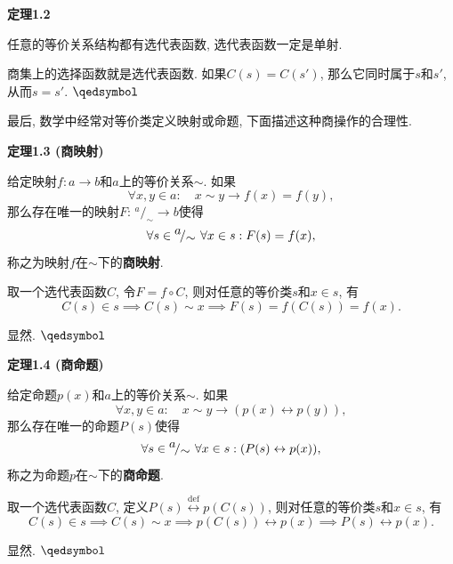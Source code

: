 \hypertarget{sec:定理1.2}{}
\noindent\textbf{定理1.2}

任意的等价关系结构都有选代表函数, 选代表函数一定是单射.


商集上的选择函数就是选代表函数.
如果$C(s)=C(s')$, 那么它同时属于$s$和$s'$, 从而$s=s'$. \hfill $\qedsymbol$

\vspace{10pt}

最后, 数学中经常对等价类定义映射或命题, 下面描述这种商操作的合理性.

\vspace{10pt}

\hypertarget{sec:定理1.3}{}
\noindent\textbf{定理1.3 (商映射)}

给定映射$f:a\to b$和$a$上的等价关系$\sim$. 如果
\[
    \forall x,y\in a:\quad x\sim y\to f(x)=f(y),
\]
那么存在唯一的映射$F:\,\!^{\displaystyle a}\!/_{\displaystyle\sim}\to b$使得
\[
    \forall s\in\,\!^{\displaystyle a}\!/_{\displaystyle\sim}\,\,
    \forall x\in s:F(s)=f(x),\\[1pt]
\]
称之为映射$f$在$\sim$下的\textbf{商映射}.



取一个选代表函数$C$, 令$F=f\circ C$, 则对任意的等价类$s$和$x\in s$, 有
\[
    C(s)\in s\implies C(s)\sim x\implies F(s)=f(C(s))=f(x).
\]

 显然. \hfill $\qedsymbol$

\vspace{10pt}

\hypertarget{sec:定理1.4}{}
\noindent\textbf{定理1.4 (商命题)}

给定命题$p(x)$和$a$上的等价关系$\sim$. 如果
\[
    \forall x,y\in a:\quad x\sim y\to(p(x)\leftrightarrow p(y)),
\]
那么存在唯一的命题$P(s)$使得
\[
    \forall s\in\,\!^{\displaystyle a}\!/_{\displaystyle\sim}\,\,
    \forall x\in s:(P(s)\leftrightarrow p(x)),\\[1pt]
\]
称之为命题$p$在$\sim$下的\textbf{商命题}.



取一个选代表函数$C$, 定义$P(s)\overset{\mathrm{def}}{\leftrightarrow}p(C(s))$,
则对任意的等价类$s$和$x\in s$, 有
\[
    C(s)\in s\implies C(s)\sim x\implies p(C(s))\leftrightarrow p(x)
    \implies P(s)\leftrightarrow p(x).
\]

 显然. \hfill $\qedsymbol$

